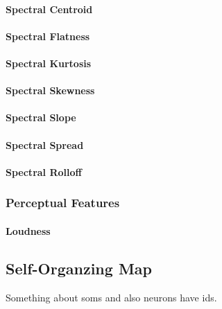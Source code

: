 \paragraph{Spectral Centroid}
\label{para:centroid}

\paragraph{Spectral Flatness}
\label{para:flatness}

\paragraph{Spectral Kurtosis}
\label{para:kurtosis}

\paragraph{Spectral Skewness}
\label{para:skewness}

\paragraph{Spectral Slope}
\label{para:slope}

\paragraph{Spectral Spread}
\label{para:spread}

\paragraph{Spectral Rolloff}
\label{para:rolloff}

\subsubsection{Perceptual Features}
\label{perceptual_features}

\paragraph{Loudness}
\label{para:loudness}

\subsection{Self-Organzing Map}
\label{subsec:som}
Something about \glspl{som} and also neurons have \glspl{id}.
